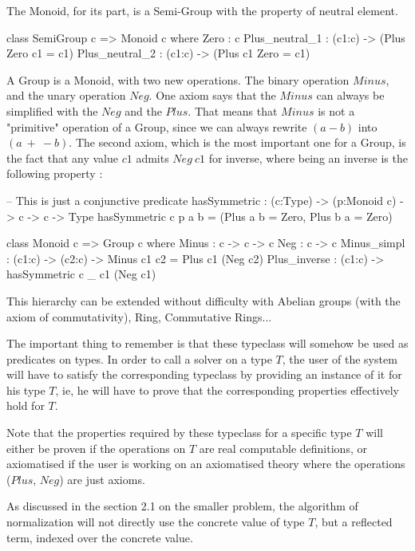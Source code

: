 \documentclass{sigplanconf}
\begin{document}
The Monoid, for its part, is a Semi-Group with the property of neutral element.

\begin{code}[caption=Monoid, captionpos=b, label=lst1:haskell2]   
class SemiGroup c => Monoid c where
    Zero : c    
    Plus_neutral_1 : (c1:c) 
            -> (Plus Zero c1 = c1)    
    Plus_neutral_2 : (c1:c) 
             -> (Plus c1 Zero = c1)
\end{code}	

A Group is a Monoid, with two new operations. The binary operation $Minus$, and the unary operation $Neg$. One axiom says that the $Minus$ can always be simplified with the $Neg$ and the $Plus$. That means that $Minus$ is not a "primitive" operation of a Group, since we can always rewrite $(a-b)$ into $(a\ +\ -b)$.
The second axiom, which is the most important one for a Group, is the fact that any value $c1$ admits $Neg\ c1$ for inverse, where being an inverse is the following property :

\begin{code}[caption=Group, captionpos=b, label=lst1:haskell2]   
-- This is just a conjunctive predicate
hasSymmetric : (c:Type) -> (p:Monoid c) 
                -> c -> c -> Type
hasSymmetric c p a b = 
         (Plus a b = Zero, Plus b a = Zero)    
  
class Monoid c => Group c where
	Minus : c -> c -> c
	Neg : c -> c
	Minus_simpl : (c1:c) -> (c2:c) -> 
	             Minus c1 c2 = Plus c1 (Neg c2) 
	Plus_inverse : (c1:c) -> 
	             hasSymmetric c _ c1 (Neg c1)
\end{code}	

This hierarchy can be extended without difficulty with Abelian groups (with the axiom of commutativity), Ring, Commutative Rings...

The important thing to remember is that these typeclass will somehow be used as predicates on types. In order to call a solver on a type $T$, the user of the system will have to satisfy the corresponding typeclass by providing an instance of it for his type $T$, ie, he will have to prove that the corresponding properties effectively hold for $T$.

Note that the properties required by these typeclass for a specific type $T$ will either be proven if the operations on $T$ are real computable definitions, or axiomatised if the user is working on an axiomatised theory where the operations ($Plus$, $Neg$) are just axioms.

As discussed in the section 2.1 on the smaller problem, the algorithm of normalization will not directly use the concrete value of type $T$, but a reflected term, indexed over the concrete value.
\end{document}
